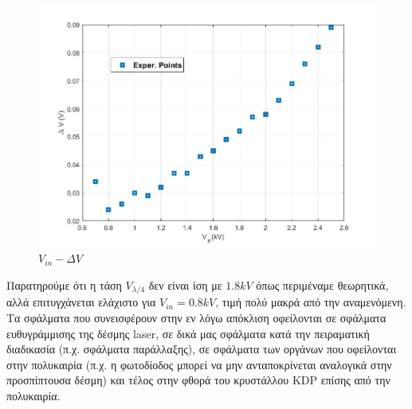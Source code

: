 \documentclass[a4paper]{article}
\begin{document}
	\begin{figure}[h!]
		\centering
		\includegraphics[scale=0.5]{plot2.jpg}
		\caption{$V_{in} - \Delta V$}
	\end{figure}
	
	Παρατηρούμε ότι η τάση $V_{\lambda/4}$ δεν είναι ίση με $1.8kV$ όπως περιμέναμε θεωρητικά, αλλά επιτυγχάνεται ελάχιστο για $V_{in} = 0.8kV$, τιμή πολύ μακρά από την αναμενόμενη. Τα σφάλματα που συνεισφέρουν στην εν λόγω απόκλιση οφείλονται σε σφάλματα ευθυγράμμισης της δέσμης laser, σε δικά μας σφάλματα κατά την πειραματική διαδικασία (π.χ. σφάλματα παράλλαξης), σε σφάλματα των οργάνων που οφείλονται στην πολυκαιρία (π.χ. η φωτοδίοδος μπορεί να μην ανταποκρίνεται αναλογικά στην προσπίπτουσα δέσμη) και τέλος στην φθορά του κρυστάλλου KDP επίσης από την πολυκαιρία.
\end{document}
